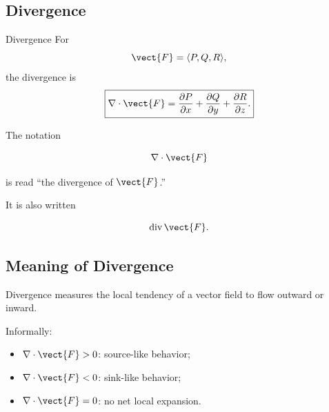 \subsection{Divergence}
\label{subsec:divergence}

\begin{definitionbox}{Divergence}
For
\[ \vect{F}=\langle P,Q,R\rangle, \]
the divergence is
\[ \boxed{
\nabla\cdot\vect{F}
=
\frac{\partial P}{\partial x}
+
\frac{\partial Q}{\partial y}
+
\frac{\partial R}{\partial z}.
} \]
\end{definitionbox}

The notation

\[ \nabla\cdot\vect{F} \]

is read ``the divergence of \(\vect{F}\).''

It is also written

\[ \operatorname{div}\vect{F}. \]

\subsection{Meaning of Divergence}
\label{subsec:meaning-divergence}

Divergence measures the local tendency of a vector field to flow outward or
inward.

Informally:

\begin{itemize}
    \item \(\nabla\cdot\vect{F}>0\): source-like behavior;
    \item \(\nabla\cdot\vect{F}<0\): sink-like behavior;
    \item \(\nabla\cdot\vect{F}=0\): no net local expansion.
\end{itemize}

\begin{center}
\end{center}

